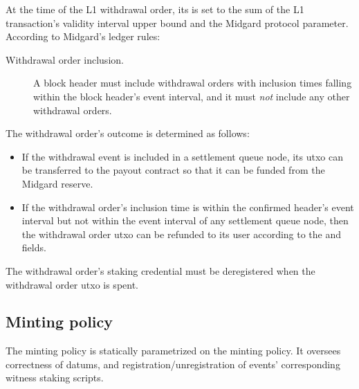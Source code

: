 \documentclass[../midgard.tex]{subfiles}
\begin{document}

At the time of the L1 withdrawal order, its  is set to the sum of the L1 transaction's validity interval upper bound and the  Midgard protocol parameter.
According to Midgard's ledger rules:
\begin{description}
    \item[Withdrawal order inclusion.] A block header must include withdrawal orders with inclusion times falling within the block header's event interval, and it must \emph{not} include any other withdrawal orders.
\end{description}

The withdrawal order's outcome is determined as follows:
\begin{itemize}
    \item If the withdrawal event is included in a settlement queue node, its utxo can be transferred to the payout contract so that it can be funded from the Midgard reserve.
    \item If the withdrawal order's inclusion time is within the confirmed header's event interval but not within the event interval of any settlement queue node, then the withdrawal order utxo can be refunded to its user according to the  and  fields.
\end{itemize}

The withdrawal order's  staking credential must be deregistered when the withdrawal order utxo is spent.

\subsection{Minting policy}
\label{h:withdrawal-order-minting-policy}

The  minting policy is statically parametrized on the  minting policy.
It oversees correctness of datums, and registration/unregistration of events' corresponding witness staking scripts.
\end{document}
